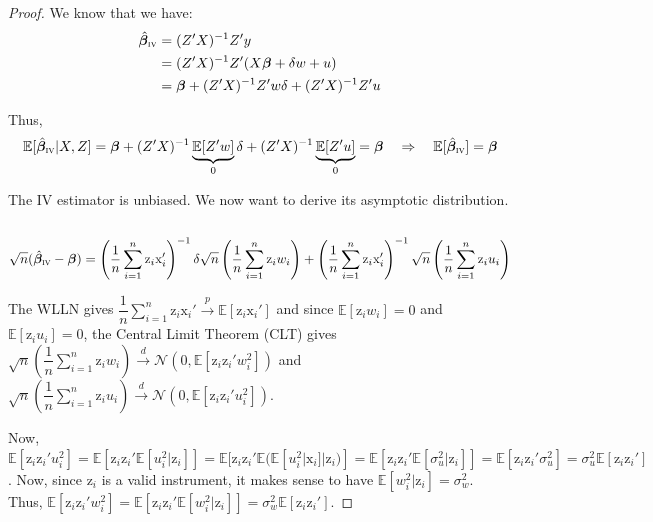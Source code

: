 \documentclass[a4paper, 11pt]{report}
\begin{document}
			\begin{proof}
			We know that we have:
			~
			\begin{align*}
				 \hat{\bm{\beta}}_{\textsc{iv}} & =  (Z'X)^{-1}Z'y\\
				 	& = (Z'X)^{-1}Z'(X\bm{\beta} + \delta w + u)\\
				 	& = \bm{\beta} + (Z'X)^{-1}Z'w \delta + (Z'X)^{-1}Z'u
			\end{align*}
			
			Thus,
			~
			\begin{equation*}
				\mathbb{E}[ \hat{\bm{\beta}}_{\textsc{iv}} | X, Z]  =  \bm{\beta} + (Z'X)^{-1}\underbrace{\mathbb{E}[Z'w]}_{0} \delta + (Z'X)^{-1}\underbrace{\mathbb{E}[Z'u]}_{0} = \bm{\beta} 
				\quad \Rightarrow \quad
				\mathbb{E}[ \hat{\bm{\beta}}_{\textsc{iv}}]  = \bm{\beta}
			\end{equation*}
			
			The IV estimator is unbiased. We now want to derive its asymptotic distribution.
			~
				\begin{equation*}
					\sqrt{n}(\hat{\bm{\beta}}_{\textsc{iv}} - \bm{\beta}) 
						= \left(\dfrac{1}{n} \sum_{i = 1}^{n} \text{z}_{i} \text{x}_{i}' \right)^{-1}  \delta  \sqrt{n} \left(\dfrac{1}{n} \sum_{i = 1}^{n} \text{z}_{i} w_{i} \right) 
							+ \left(\dfrac{1}{n} \sum_{i = 1}^{n} \text{z}_{i} \text{x}_{i}' \right)^{-1}  \sqrt{n} \left(\dfrac{1}{n} \sum_{i = 1}^{n} \text{z}_{i} u_{i} \right) 
				\end{equation*}	
				
			The WLLN gives $\dfrac{1}{n} \sum_{i = 1}^{n} \text{z}_{i} \text{x}_{i}'  \overset{p}{\to}  \mathbb{E}[\text{z}_{i}\text{x}_{i}']$ and since $\mathbb{E}[\text{z}_{i}w_{i}] = 0$ and $\mathbb{E}[\text{z}_{i}u_{i}] = 0$, the Central Limit Theorem (CLT) gives $\sqrt{n} \left(\dfrac{1}{n} \sum_{i = 1}^{n} \text{z}_{i} w_{i} \right) \overset{d}{\to} \mathcal{N}(0, \mathbb{E}[\text{z}_{i}\text{z}_{i}'w_{i}^{2}])$ and $\sqrt{n} \left(\dfrac{1}{n} \sum_{i = 1}^{n} \text{z}_{i} u_{i} \right) \overset{d}{\to} \mathcal{N}(0, \mathbb{E}[\text{z}_{i}\text{z}_{i}'u_{i}^{2}])$.  
			
			Now, $\mathbb{E}[\text{z}_{i}\text{z}_{i}'u_{i}^{2}]  = 
				\mathbb{E}[\text{z}_{i}\text{z}_{i}'\mathbb{E}[u_{i}^{2} | \text{z}_{i}]] = 
				\mathbb{E}[\text{z}_{i}\text{z}_{i}'\mathbb{E}(\mathbb{E}[u_{i}^{2} | \text{x}_{i}] | \text{z}_{i})] = 
				\mathbb{E}[\text{z}_{i}\text{z}_{i}'\mathbb{E}[\sigma_{u}^{2} | \text{z}_{i}]] = 
				\mathbb{E}[\text{z}_{i}\text{z}_{i}'\sigma_{u}^{2}] = 
				\sigma_{u}^{2}\mathbb{E}[\text{z}_{i}\text{z}_{i}']$.
			Now, since $\text{z}_{i}$ is a valid instrument, it makes sense to have $\mathbb{E}[w_{i}^{2} | \text{z}_{i}] = \sigma_{w}^{2}$. Thus, $\mathbb{E}[\text{z}_{i}\text{z}_{i}'w_{i}^{2}]  = 
				\mathbb{E}[\text{z}_{i}\text{z}_{i}'\mathbb{E}[w_{i}^{2} | \text{z}_{i}]] = 
				\sigma_{w}^{2}\mathbb{E}[\text{z}_{i}\text{z}_{i}']$.
				

\end{proof}
\end{document}
